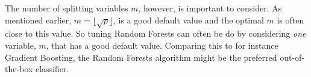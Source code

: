 The number of splitting variables $m$, however, is  important to consider. As mentioned earlier, $m = \lfloor \sqrt{p} \rfloor$, is a good default value and the optimal $m$ is often close to this value. 
So tuning Random Forests can often be do by considering \textit{one} variable, $m$, that has a good default value. Comparing this to for instance Gradient Boosting, the Random Forests algorithm might be the preferred out-of-the-box classifier. 

